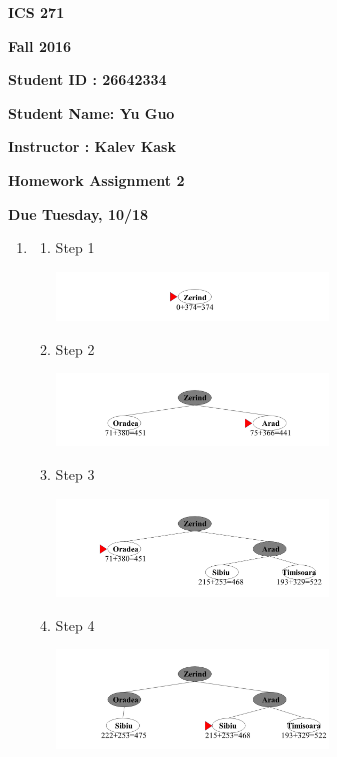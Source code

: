 \documentclass{article}
\begin{document}
{\bf ICS 271}

{\bf Fall 2016}

{\bf Student ID : 26642334}

{\bf Student Name: Yu Guo}

{\bf Instructor : Kalev Kask}

{\bf Homework Assignment 2}

{\bf Due Tuesday, 10/18}




\begin{enumerate}

\item
\begin{enumerate}
  \item Step 1

  \includegraphics[width=0.6\textwidth]{figure/Slide1.PNG}

  \item Step 2
  
  \includegraphics[width=0.6\textwidth]{figure/Slide2.PNG}

  \item Step 3
  
  \includegraphics[width=0.6\textwidth]{figure/Slide3.PNG}

  \item Step 4
  
  \includegraphics[width=0.6\textwidth]{figure/Slide4.PNG}


\end{enumerate}
\end{enumerate}
\end{document}
